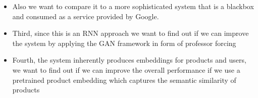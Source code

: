 \begin{itemize}
\begin{itemize}
    \item Also we want to compare it to a more sophisticated system that is a blackbox and consumed as a service provided by Google.
    \item Third, since this is an RNN approach we want to find out if we can improve the system by applying the GAN framework in form of professor forcing
    \item Fourth, the system inherently produces embeddings for products and users, we want to find out if we can improve the overall performance if we use a pretrained product embedding which captures the semantic similarity of products
\end{itemize} 
\end{itemize}